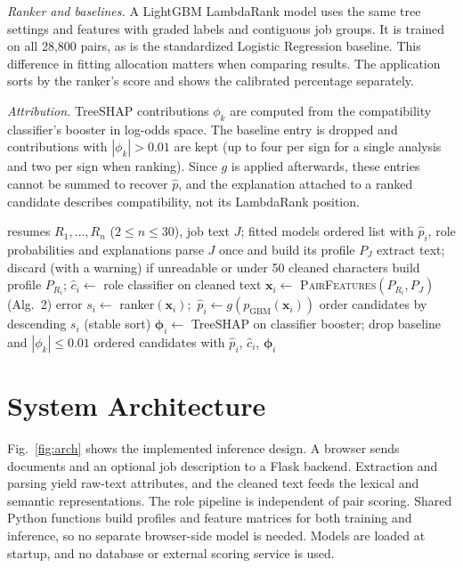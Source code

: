 \documentclass[conference]{IEEEtran}
\begin{document}
\textit{Ranker and baselines.} A LightGBM LambdaRank model uses the same tree settings and features with graded labels and contiguous job groups. It is trained on all 28,800 pairs, as is the standardized Logistic Regression baseline. This difference in fitting allocation matters when comparing results. The application sorts by the ranker's score and shows the calibrated percentage separately.

\textit{Attribution.} TreeSHAP contributions $\phi_k$ are computed from the compatibility classifier's booster in log-odds space. The baseline entry is dropped and contributions with $|\phi_k|>0.01$ are kept (up to four per sign for a single analysis and two per sign when ranking). Since $g$ is applied afterwards, these entries cannot be summed to recover $\hat{p}$, and the explanation attached to a ranked candidate describes compatibility, not its LambdaRank position.

\begin{algorithm}[!tb]
\caption{Candidate ranking and explanation at inference}
\small
\begin{algorithmic}[1]
\Require resumes $R_1,\dots,R_n$ ($2\le n\le 30$), job text $J$; fitted models
\Ensure ordered list with $\hat{p}_i$, role probabilities and explanations
\State parse $J$ once and build its profile $P_J$
  \State extract text; discard (with a warning) if unreadable or under 50 cleaned characters
  \State build profile $P_{R_i}$; $\hat{c}_i\leftarrow$ role classifier on cleaned text
  \State $\mathbf{x}_i\leftarrow$ \textsc{PairFeatures}$(P_{R_i},P_J)$ (Alg.~2)
\EndFor
{} \State \Return error \EndIf
\State $s_i\leftarrow$ ranker$(\mathbf{x}_i)$;\ $\hat{p}_i\leftarrow g(p_{\mathrm{GBM}}(\mathbf{x}_i))$
\State order candidates by descending $s_i$ (stable sort)
  \State $\boldsymbol{\phi}_i\leftarrow$ TreeSHAP on classifier booster; drop baseline and $|\phi_k|\le 0.01$
\EndFor
\State \Return ordered candidates with $\hat{p}_i$, $\hat{c}_i$, $\boldsymbol{\phi}_i$
\end{algorithmic}
\end{algorithm}

\section{System Architecture}
Fig.~\ref{fig:arch} shows the implemented inference design. A browser sends documents and an optional job description to a Flask backend. Extraction and parsing yield raw-text attributes, and the cleaned text feeds the lexical and semantic representations. The role pipeline is independent of pair scoring. Shared Python functions build profiles and feature matrices for both training and inference, so no separate browser-side model is needed. Models are loaded at startup, and no database or external scoring service is used.
\end{document}
